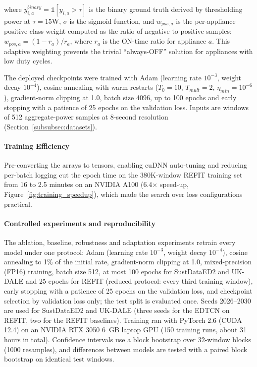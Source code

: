 \documentclass[fleqn,10pt]{wlscirep}
\begin{document}
where $y_{i,a}^{binary} = \mathbb{1}[y_{i,a} > \tau]$ is the binary ground truth derived by thresholding power at $\tau=15$W, $\sigma$ is the sigmoid function, and $w_{pos,a}$ is the per-appliance positive class weight computed as the ratio of negative to positive samples: $w_{pos,a} = (1 - r_a) / r_a$, where $r_a$ is the ON-time ratio for appliance $a$. This adaptive weighting prevents the trivial ``always-OFF'' solution for appliances with low duty cycles.

The deployed checkpoints were trained with Adam (learning rate $10^{-3}$, weight decay $10^{-4}$), cosine annealing with warm restarts ($T_0=10$, $T_{mult}=2$, $\eta_{min}=10^{-6}$), gradient-norm clipping at 1.0, batch size 4096, up to 100 epochs and early stopping with a patience of 25 epochs on the validation loss. Inputs are windows of 512 aggregate-power samples at 8-second resolution (Section~\ref{subsubsec:datasets}).

\paragraph{Training Efficiency} Pre-converting the arrays to tensors, enabling cuDNN auto-tuning and reducing per-batch logging cut the epoch time on the 380K-window REFIT training set from 16 to 2.5 minutes on an NVIDIA A100 (6.4$\times$ speed-up, Figure~\ref{fig:training_speedup}), which made the search over loss configurations practical.


\paragraph{Controlled experiments and reproducibility} The ablation, baseline, robustness and adaptation experiments retrain every model under one protocol: Adam (learning rate $10^{-3}$, weight decay $10^{-4}$), cosine annealing to 1\% of the initial rate, gradient-norm clipping at 1.0, mixed-precision (FP16) training, batch size 512, at most 100 epochs for SustDataED2 and UK-DALE and 25 epochs for REFIT (reduced protocol: every third training window), early stopping with a patience of 25 epochs on the validation loss, and checkpoint selection by validation loss only; the test split is evaluated once. Seeds 2026--2030 are used for SustDataED2 and UK-DALE (three seeds for the EDTCN on REFIT, two for the REFIT baselines). Training ran with PyTorch 2.6 (CUDA 12.4) on an NVIDIA RTX 3050 6~GB laptop GPU (150 training runs, about 31 hours in total). Confidence intervals use a block bootstrap over 32-window blocks (1000 resamples), and differences between models are tested with a paired block bootstrap on identical test windows.
\end{document}

